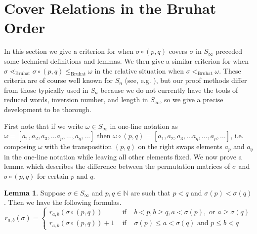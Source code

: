 \documentclass[oneside,11pt,reqno]{amsart}
\newcommand{\nn}{\ensuremath{\mathbb{N}}}
\theoremstyle{definition}
\newtheorem{proof techniques}{Proof Techniques}
\newtheorem{lemma}{Lemma}
\begin{document}


\section{Cover Relations in the Bruhat Order}\label{sec: Cover Relations in the Bruhat Order}

In this section we give a criterion for when $\sigma \circ (p , q)$ covers $\sigma$ in $S_\infty$ preceded some technical definitions and lemmas. We then give a similar criterion for when $\sigma \lessdot_\text{Bruhat} \sigma \circ (p , q) \leq_\text{Bruhat} \omega$ in the relative situation when $\sigma <_\text{Bruhat} \omega$. These criteria are of course well known for $S_n$ (see, e.g. \cite[Lemma 2.1.4]{bjorner2005combinatorics}), but our proof methods differ from those typically used in $S_n$ because we do not currently have the tools of reduced words, inversion number, and length in $S_\infty$, so we give a precise development to be thorough. 

First note that if we write $\omega \in S_\infty$ in one-line notation as $\omega = [a_1, a_2, a_3, \ldots a_p, \ldots, a_q, \ldots]$ then $\omega \circ (p,q) = [a_1, a_2, a_3, \ldots a_q, \ldots, a_p, \ldots]$, i.e. composing $\omega$ with the transposition $(p,q)$ on the right swaps elements $a_p$ and $a_q$ in the one-line notation while leaving all other elements fixed. We now prove a lemma which describes the difference between the permutation matrices of $\sigma$ and $\sigma \circ (p , q)$ for certain $p$ and $q$. 

\begin{lemma}\label{lem: ones in boxes after applying a transposition}
    Suppose $\sigma \in S_\infty$ and $p , q \in \nn$ are such that $p < q$ and $\sigma(p) < \sigma(q)$. Then we have the following formulas. 
    \begin{equation*}
        r_{a , b}(\sigma) = \left\{ \begin{matrix} r_{a , b}(\sigma \circ (p , q)) & \text{ if } & b < p, b \geq q , a < \sigma(p), \text{ or } a \geq \sigma(q) \\ r_{a , b}(\sigma \circ (p , q)) + 1 & \text{ if } & \sigma(p) \leq a < \sigma(q) \text{ and } p \leq b < q  \end{matrix} \right. 
    \end{equation*} 
\end{lemma}
\end{document}
